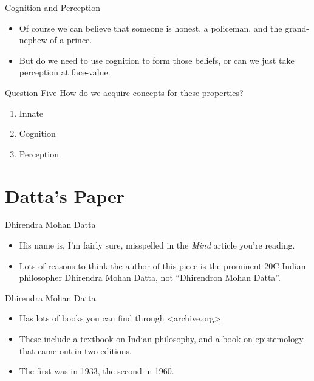 \documentclass[
  17pt,
  letterpaper,
  ignorenonframetext,
  aspectratio=169,
  handout]{beamer}
\providecommand{\tightlist}{%
  \setlength{\itemsep}{0pt}\setlength{\parskip}{0pt}}\usepackage{longtable,booktabs,array}
\begin{document}
\begin{frame}{Cognition and Perception}
\protect\hypertarget{cognition-and-perception}{}
\begin{itemize}[<+->]
\tightlist
\item
  Of course we can believe that someone is honest, a policeman, and the
  grand-nephew of a prince.
\item
  But do we need to use cognition to form those beliefs, or can we just
  take perception at face-value.
\end{itemize}
\end{frame}

\begin{frame}{Question Five}
\protect\hypertarget{question-five}{}
How do we acquire concepts for these properties?

\begin{enumerate}[<+->]
\tightlist
\item
  Innate
\item
  Cognition
\item
  Perception
\end{enumerate}
\end{frame}

\hypertarget{dattas-paper}{%
\section{Datta's Paper}\label{dattas-paper}}

\begin{frame}{Dhirendra Mohan Datta}
\protect\hypertarget{dhirendra-mohan-datta}{}
\begin{itemize}[<+->]
\tightlist
\item
  His name is, I'm fairly sure, misspelled in the \emph{Mind} article
  you're reading.
\item
  Lots of reasons to think the author of this piece is the prominent 20C
  Indian philosopher Dhirendra Mohan Datta, not ``Dhirendron Mohan
  Datta''.
\end{itemize}
\end{frame}

\begin{frame}{Dhirendra Mohan Datta}
\protect\hypertarget{dhirendra-mohan-datta-1}{}
\begin{itemize}[<+->]
\tightlist
\item
  Has lots of books you can find through
  \textless archive.org\textgreater.
\item
  These include a textbook on Indian philosophy, and a book on
  epistemology that came out in two editions.
\item
  The first was in 1933, the second in 1960.
\end{itemize}
\end{frame}
\end{document}
